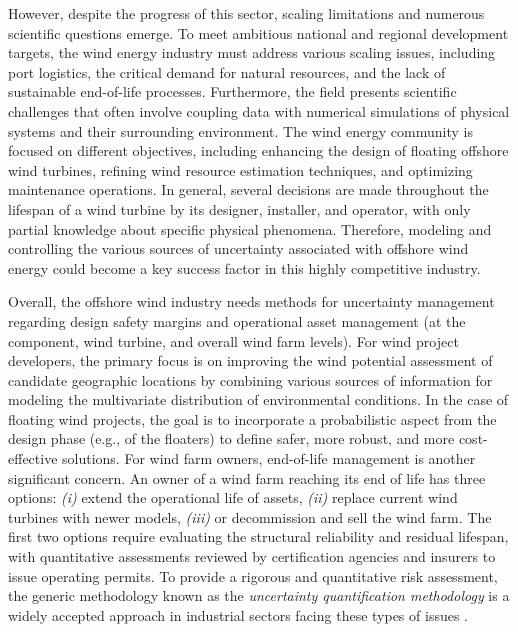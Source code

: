 However, despite the progress of this sector, scaling limitations and numerous scientific questions emerge. 
To meet ambitious national and regional development targets, the wind energy industry must address various scaling issues, including port logistics, the critical demand for natural resources, and the lack of sustainable end-of-life processes. 
Furthermore, the field presents scientific challenges that often involve coupling data with numerical simulations of physical systems and their surrounding environment. 
The wind energy community is focused on different objectives, including enhancing the design of floating offshore wind turbines, refining wind resource estimation techniques, and optimizing maintenance operations. 
In general, several decisions are made throughout the lifespan of a wind turbine by its designer, installer, and operator, with only partial knowledge about specific physical phenomena. 
Therefore, modeling and controlling the various sources of uncertainty associated with offshore wind energy could become a key success factor in this highly competitive industry.

Overall, the offshore wind industry needs methods for uncertainty management \citep{OWT_review_2016} regarding design safety margins and operational asset management (at the component, wind turbine, and overall wind farm levels). 
For wind project developers, the primary focus is on improving the wind potential assessment of candidate geographic locations by combining various sources of information for modeling the multivariate distribution of environmental conditions. 
In the case of floating wind projects, the goal is to incorporate a probabilistic aspect from the design phase (e.g., of the floaters) to define safer, more robust, and more cost-effective solutions.
For wind farm owners, end-of-life management is another significant concern. 
An owner of a wind farm reaching its end of life has three options: \textit{(i)} extend the operational life of assets, \textit{(ii)} replace current wind turbines with newer models, \textit{(iii)} or decommission and sell the wind farm. 
The first two options require evaluating the structural reliability and residual lifespan, with quantitative assessments reviewed by certification agencies and insurers to issue operating permits. 
To provide a rigorous and quantitative risk assessment, the generic methodology known as the \textit{uncertainty quantification methodology} is a widely accepted approach in industrial sectors facing these types of issues \citep{rocquigny_2008,blanchard_2023}.




